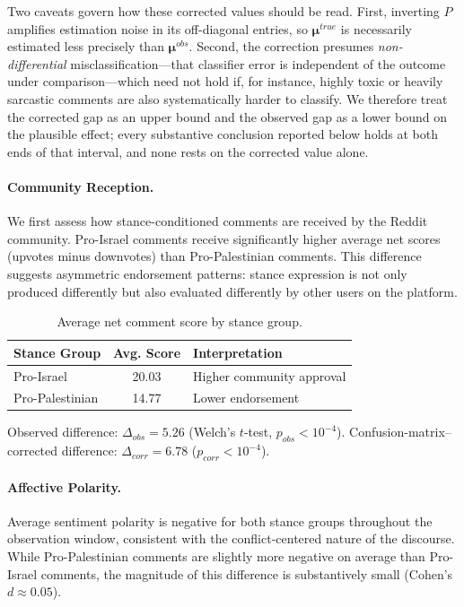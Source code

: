 \documentclass[letterpaper]{article} %
\begin{document}
Two caveats govern how these corrected values should be read. First, inverting $P$ amplifies estimation noise in its off-diagonal entries, so $\boldsymbol{\mu}^{true}$ is necessarily estimated less precisely than $\boldsymbol{\mu}^{obs}$. Second, the correction presumes \emph{non-differential} misclassification---that classifier error is independent of the outcome under comparison---which need not hold if, for instance, highly toxic or heavily sarcastic comments are also systematically harder to classify. We therefore treat the corrected gap as an upper bound and the observed gap as a lower bound on the plausible effect; every substantive conclusion reported below holds at both ends of that interval, and none rests on the corrected value alone.

\paragraph{Community Reception.}
We first assess how stance-conditioned comments are received by the Reddit community. Pro-Israel comments receive significantly higher average net scores (upvotes minus downvotes) than Pro-Palestinian comments. This difference suggests asymmetric endorsement patterns: stance expression is not only produced differently but also evaluated differently by other users on the platform.

\begin{table}[t]
\centering
\begin{threeparttable}
\caption{Average net comment score by stance group.}
\label{tab:engagement}
\begin{tabular}{l c p{3cm}}
\toprule
\textbf{Stance Group} & \textbf{Avg. Score} & \textbf{Interpretation} \\
\midrule
Pro-Israel        & 20.03 & Higher community approval \\
Pro-Palestinian   & 14.77 & Lower endorsement \\
\bottomrule
\end{tabular}
\begin{tablenotes}[flushleft]\footnotesize
\item Observed difference: $\Delta_{obs}=5.26$ (Welch’s $t$-test, $p_{obs}<10^{-4}$). Confusion-matrix–corrected difference: $\Delta_{corr}=6.78$ ($p_{corr}<10^{-4}$).
\end{tablenotes}
\end{threeparttable}
\end{table}

\paragraph{Affective Polarity.}
Average sentiment polarity is negative for both stance groups throughout the observation window, consistent with the conflict-centered nature of the discourse. While Pro-Palestinian comments are slightly more negative on average than Pro-Israel comments, the magnitude of this difference is substantively small (Cohen’s $d \approx 0.05$). 
\end{document}
